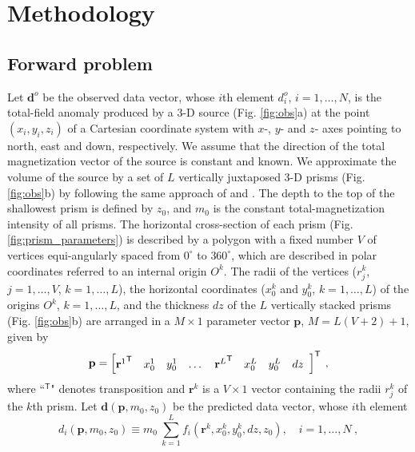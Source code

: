 \section{Methodology}\label{sec:metodo}

\subsection{Forward problem}

Let $\mathbf{d}^{o}$ be the observed data vector, whose $i$th element $d^{o}_{i}$, $i = 1, \dots, N$, is the total-field anomaly produced by a 3-D source (Fig. \ref{fig:obs}a) at the point $(x_{i}, y_{i}, z_{i})$ of a Cartesian coordinate system with $x$-, $y$- and $z$- axes pointing to north, east and down, respectively. We assume that the direction of the total magnetization vector of the source is constant and known. We approximate the volume of the source by a set of $L$ vertically juxtaposed 3-D prisms (Fig. \ref{fig:obs}b) by following the same approach of \cite{oliveirajr-etal2011} and \cite{oliveirajr-barbosa2013}. The depth to the top of the shallowest prism is defined by $z_{0}$, and $m_{0}$ is the constant total-magnetization intensity of all prisms. The horizontal cross-section of each prism (Fig. \ref{fig:prism_parameters}) 
is described by a polygon with a fixed number $V$ of vertices equi-angularly spaced from $0^{\circ}$ to $360^{\circ}$, which are described in polar coordinates referred to an internal origin $O^{k}$. The radii of the vertices ($r^{k}_{j}$, $j=1,\dots , V$, $k=1,\dots ,L$), the horizontal coordinates ($x_{0}^{k}$ and $y_{0}^{k}$, $k=1,\dots ,L$) of the origins $O^{k}$, $k=1,\dots ,L$, and the thickness $dz$ of the $L$ vertically stacked prisms (Fig. \ref{fig:obs}b) are arranged in a $M \times 1$ parameter vector $\mathbf{p}$, $M = L (V + 2) + 1$, given by
\begin{equation}
\mathbf{p} = \left[ \begin{array}{@{}*{12}{c}@{}}
{\mathbf{r}^{1}}^{\mathsf{T}} & x_{0}^{1} & y_{0}^{1} & \dots & {\mathbf{r}^{L}}^{\mathsf{T}} & x_{0}^{L} & y_{0}^{L} & dz \\
\end{array} \right]^{\mathsf{T}} \: ,
\label{eq:p-vector}
\end{equation}
where ``$^{\mathsf{T}}$" denotes transposition and $\mathbf{r}^{k}$ is a $V \times 1$ vector containing the radii $r^{k}_{j}$ 
of the $k$th prism.
Let $\mathbf{d} (\mathbf{p}, m_{0}, z_{0})$ be the predicted data vector, 
whose $i$th element 
\begin{equation}
d_{i} (\mathbf{p}, m_{0}, z_{0}) \equiv m_{0} \: \sum\limits_{k=1}^{L} f_{i}(\mathbf{r}^{k}, x_{0}^{k}, y_{0}^{k}, dz, z_{0}), \quad i = 1, \dots, N \: ,
\label{eq:predicted-data-i}
\end{equation}
